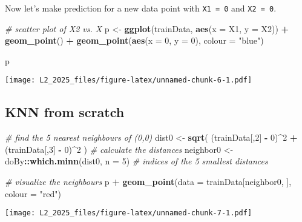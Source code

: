 \documentclass[
]{article}
\newenvironment{Shaded}{\begin{snugshade}}{\end{snugshade}}
\newcommand{\AttributeTok}[1]{\textcolor[rgb]{0.13,0.29,0.53}{#1}}
\newcommand{\CommentTok}[1]{\textcolor[rgb]{0.56,0.35,0.01}{\textit{#1}}}
\newcommand{\DecValTok}[1]{\textcolor[rgb]{0.00,0.00,0.81}{#1}}
\newcommand{\FunctionTok}[1]{\textcolor[rgb]{0.13,0.29,0.53}{\textbf{#1}}}
\newcommand{\NormalTok}[1]{#1}
\newcommand{\OtherTok}[1]{\textcolor[rgb]{0.56,0.35,0.01}{#1}}
\newcommand{\SpecialCharTok}[1]{\textcolor[rgb]{0.81,0.36,0.00}{\textbf{#1}}}
\newcommand{\StringTok}[1]{\textcolor[rgb]{0.31,0.60,0.02}{#1}}
\begin{document}
Now let's make prediction for a new data point with \texttt{X1\ =\ 0}
and \texttt{X2\ =\ 0}.

\begin{Shaded}
\begin{Highlighting}[]
\CommentTok{\# scatter plot of X2 vs. X}
\NormalTok{p }\OtherTok{\textless{}{-}} \FunctionTok{ggplot}\NormalTok{(trainData, }\FunctionTok{aes}\NormalTok{(}\AttributeTok{x =}\NormalTok{ X1, }\AttributeTok{y =}\NormalTok{ X2)) }\SpecialCharTok{+} \FunctionTok{geom\_point}\NormalTok{() }\SpecialCharTok{+}
  \FunctionTok{geom\_point}\NormalTok{(}\FunctionTok{aes}\NormalTok{(}\AttributeTok{x =} \DecValTok{0}\NormalTok{, }\AttributeTok{y =} \DecValTok{0}\NormalTok{), }\AttributeTok{colour =} \StringTok{"blue"}\NormalTok{)}
 
\NormalTok{p }
\end{Highlighting}
\end{Shaded}

\texttt{[image: L2\_2025\_files/figure-latex/unnamed-chunk-6-1.pdf]}

\subsection{KNN from scratch}\label{knn-from-scratch}

\begin{Shaded}
\begin{Highlighting}[]
\CommentTok{\# find the 5 nearest neighbours of (0,0)}
\NormalTok{dist0 }\OtherTok{\textless{}{-}} \FunctionTok{sqrt}\NormalTok{( (trainData[,}\DecValTok{2}\NormalTok{] }\SpecialCharTok{{-}} \DecValTok{0}\NormalTok{)}\SpecialCharTok{\^{}}\DecValTok{2} \SpecialCharTok{+}\NormalTok{ (trainData[,}\DecValTok{3}\NormalTok{] }\SpecialCharTok{{-}} \DecValTok{0}\NormalTok{)}\SpecialCharTok{\^{}}\DecValTok{2}\NormalTok{ ) }\CommentTok{\# calculate the distances }
\NormalTok{neighbor0 }\OtherTok{\textless{}{-}}\NormalTok{ doBy}\SpecialCharTok{::}\FunctionTok{which.minn}\NormalTok{(dist0, }\AttributeTok{n =} \DecValTok{5}\NormalTok{) }\CommentTok{\# indices of the 5 smallest distances}

\CommentTok{\# visualize the neighbours}
\NormalTok{p }\SpecialCharTok{+} \FunctionTok{geom\_point}\NormalTok{(}\AttributeTok{data =}\NormalTok{ trainData[neighbor0, ], }
               \AttributeTok{colour =} \StringTok{"red"}\NormalTok{)}
\end{Highlighting}
\end{Shaded}

\texttt{[image: L2\_2025\_files/figure-latex/unnamed-chunk-7-1.pdf]}
\end{document}
